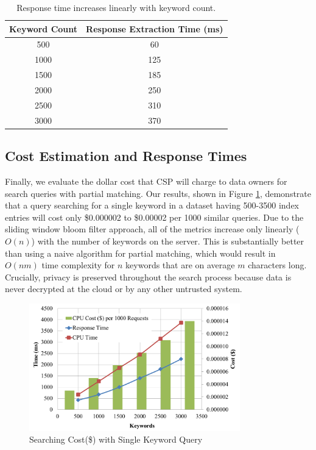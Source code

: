 \begin{table}[th!]
\centering
\caption{Response time increases linearly with keyword count.}
\label{tab:search_response_time}
\begin{tabular}{| c | c | }
\hline
Keyword Count & Response Extraction Time (ms) \\
\hline
500  &  60 \\
1000 &  125 \\
1500 &  185 \\
2000 &  250 \\
2500 &  310 \\
3000 &  370 \\
\hline
\end{tabular}


\end{table}


\subsection{Cost Estimation and Response Times}

Finally, we evaluate the dollar cost that CSP will charge to data owners for search
queries with partial matching. 
Our results, shown in Figure \ref{fig:cost_single_query}, demonstrate that a query
searching for a single keyword in a dataset having 500-3500 index entries will cost only 
\$0.000002 to \$0.00002 per 1000 similar
queries. Due to the sliding window bloom filter approach, 
all of the metrics increase only linearly ($O(n)$) with the number
of keywords on the server. This is substantially better than using a naive algorithm 
for partial matching, which would result in $O(nm)$ time complexity 
for $n$ keywords that are on average $m$ characters long. Crucially,
privacy is preserved throughout the search process because data is never
decrypted at the cloud or by any other untrusted system.


\begin{figure}
  \centering
  \includegraphics[width= 3.6in]{figures/cost_keywords_graph.png}
  \caption{Searching Cost(\$) with Single Keyword Query}
  \label{fig:cost_single_query}
\end{figure}

